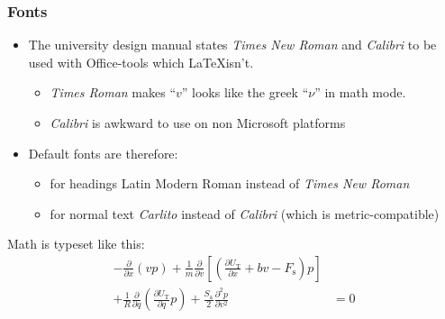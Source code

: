 \documentclass[aspectratio=169]{beamer}
\begin{document}
\begin{frame}
  \frametitle{Fonts}
  \begin{itemize}
  \item The university design manual states \emph{Times New Roman} and \emph{Calibri} to be used with Office-tools which \LaTeX isn't.
    \begin{itemize}
    \item \textit{Times Roman} makes ``$v$'' looks like the greek ``$\nu$'' in math mode.
    \item \textit{Calibri} is awkward to use on non Microsoft platforms
    \end{itemize}
  \item Default fonts are therefore:
    \begin{itemize}
    \item for headings {\rmfamily Latin Modern Roman} instead of \emph{Times New Roman}
    \item for normal text \emph{Carlito} instead of \emph{Calibri} (which is metric-compatible)
    \end{itemize}
  \end{itemize}
  \vfill

Math is typeset like this:
\begin{align*}
-\frac{\partial}{\partial x}\left(vp\right)
+\frac{1}{m}\frac{\partial}{\partial v}\left[\left( \frac{\partial U_\mathrm{T}}{\partial x} +bv-F_\mathrm{s}\right)p\right] & \\
+\frac{1}{R}\frac{\partial}{\partial q}\left( \frac{\partial U_\mathrm{T}}{\partial q}p\right)
+ \frac{S_\mathrm{a}}{2}\frac{\partial^2p}{\partial v^2} & = 0
\end{align*}
\end{frame}
\end{document}
